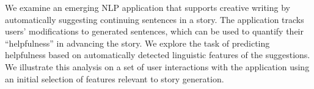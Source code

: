 We examine an emerging NLP application that supports creative writing by automatically suggesting continuing sentences in a story. The application tracks users' modifications to generated sentences, which can be used to quantify their ``helpfulness'' in advancing the story. We explore the task of predicting helpfulness based on automatically detected linguistic features of the suggestions. We illustrate this analysis on a set of user interactions with the application using an initial selection of features relevant to story generation.
